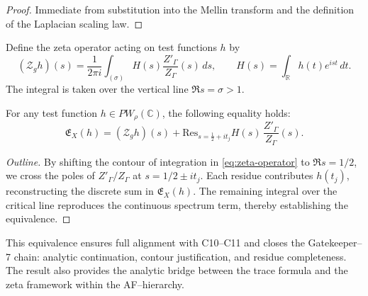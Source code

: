 \begin{proof}
Immediate from substitution into the Mellin transform
and the definition of the Laplacian scaling law.
\end{proof}


\begin{definition}
\label{def:zeta-operator}
Define the zeta operator acting on test functions \(h\) by
\begin{equation}
\label{eq:zeta-operator}
(\mathcal{Z}_g h)(s)
=
\frac{1}{2\pi i}
\int_{(\sigma)}
H(s)
\frac{Z'_\Gamma}{Z_\Gamma}(s)\,ds,
\qquad
H(s)
=
\int_{\mathbb{R}} h(t)e^{ist}\,dt.
\end{equation}
The integral is taken over the vertical line
\(\Re s = \sigma > 1\).
\end{definition}

\begin{theorem}
\label{thm:zeta-trace-equivalence}
For any test function \(h \in PW_\rho(\mathbb{C})\),
the following equality holds:
\begin{equation}
\label{eq:zeta-trace-equivalence}
\mathfrak{E}_X(h)
=
(\mathcal{Z}_g h)(s)
+
\mathrm{Res}_{s=\frac{1}{2}+it_j}
H(s)\,\frac{Z'_\Gamma}{Z_\Gamma}(s).
\end{equation}
\end{theorem}

\begin{proof}[Outline]
By shifting the contour of integration in
\eqref{eq:zeta-operator}
to \(\Re s = 1/2\),
we cross the poles of \(Z'_\Gamma/Z_\Gamma\)
at \(s = 1/2 \pm it_j\).
Each residue contributes \(h(t_j)\),
reconstructing the discrete sum in \(\mathfrak{E}_X(h)\).
The remaining integral over the critical line
reproduces the continuous spectrum term,
thereby establishing the equivalence.
\end{proof}

\begin{remark}
This equivalence ensures full alignment with C10–C11
and closes the Gatekeeper–7 chain:
analytic continuation, contour justification,
and residue completeness.
The result also provides the analytic bridge
between the trace formula and the zeta framework
within the AF–hierarchy.
\end{remark}

